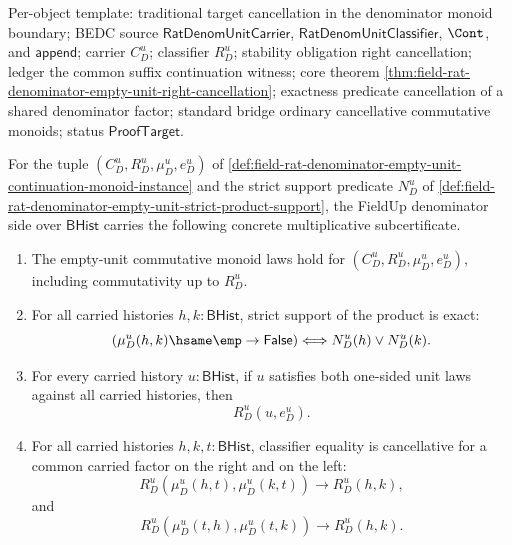 Per-object template: traditional target cancellation in the denominator monoid
boundary; BEDC source $\mathsf{RatDenomUnitCarrier}$,
$\mathsf{RatDenomUnitClassifier}$, $\Cont$, and $\mathsf{append}$; carrier
$C_D^u$; classifier $R_D^u$; stability obligation right cancellation; ledger
the common suffix continuation witness; core theorem
\autoref{thm:field-rat-denominator-empty-unit-right-cancellation}; exactness
predicate cancellation of a shared denominator factor; standard bridge
ordinary cancellative commutative monoids; status $\mathsf{ProofTarget}$.

\begin{theorem}
\label{thm:field-rat-denominator-empty-unit-field-multiplicative-subcertificate}
For the tuple $(C_D^u,R_D^u,\mu_D^u,e_D^u)$ of
\autoref{def:field-rat-denominator-empty-unit-continuation-monoid-instance} and
the strict support predicate $N_D^u$ of
\autoref{def:field-rat-denominator-empty-unit-strict-product-support}, the
FieldUp denominator side over $\mathsf{BHist}$ carries the following concrete
multiplicative subcertificate.
\begin{enumerate}
\item The empty-unit commutative monoid laws hold for
$(C_D^u,R_D^u,\mu_D^u,e_D^u)$, including commutativity up to $R_D^u$.

\item For all carried histories $h,k:\mathsf{BHist}$, strict support of the
product is exact:
$$
(\mu_D^u(h,k)\hsame\emp\to\mathsf{False})
\Longleftrightarrow
N_D^u(h)\lor N_D^u(k).
$$

\item For every carried history $u:\mathsf{BHist}$, if $u$ satisfies both
one-sided unit laws against all carried histories, then
$$
R_D^u(u,e_D^u).
$$

\item For all carried histories $h,k,t:\mathsf{BHist}$, classifier equality is
cancellative for a common carried factor on the right and on the left:
$$
R_D^u(\mu_D^u(h,t),\mu_D^u(k,t))\to R_D^u(h,k),
$$
and
$$
R_D^u(\mu_D^u(t,h),\mu_D^u(t,k))\to R_D^u(h,k).
$$
\end{enumerate}
\end{theorem}
